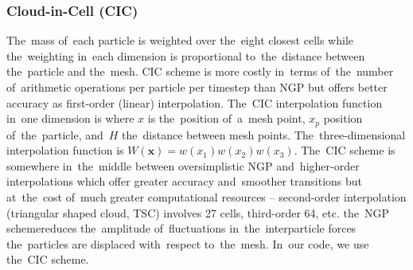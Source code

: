 \subsubsection{Cloud-in-Cell (CIC)}
The~mass of~each particle is weighted over the~eight closest cells while the~weighting in~each dimension is proportional to~the~distance between the~particle and the~mesh. CIC scheme is more costly in~terms of~the~number of~arithmetic operations per particle per timestep than NGP but offers better accuracy as first-order (linear) interpolation. The~CIC interpolation function in~one dimension is
where $x$ is the~position of~a~mesh point, $x_p$ position of~the~particle, and~$H$ the~distance between mesh points. The~three-dimensional interpolation function is \(W(\mathbf x)=w(x_1)w(x_2)w(x_3)\). The~CIC scheme is somewhere in~the~middle between oversimplistic NGP and~higher-order interpolations which offer greater accuracy and~smoother transitions but at~the~cost of~much greater computational resources -- second-order interpolation (triangular shaped cloud, TSC) involves 27 cells, third-order 64, etc. \DIFdelbegin {}\DIFdelend \DIFaddbegin {}\DIFaddend the~NGP scheme\DIFdelbegin {}\DIFdelend \DIFaddbegin {}\DIFaddend reduces the~amplitude of~fluctuations in~the~interparticle forces \DIFdelbegin {}\DIFdelend \DIFaddbegin {}\DIFaddend the~particles are displaced with~respect to~the~mesh. In~our code, we use the~CIC scheme.
\addtocounter{subsubsection}{-1}%
\DIFdelend 

